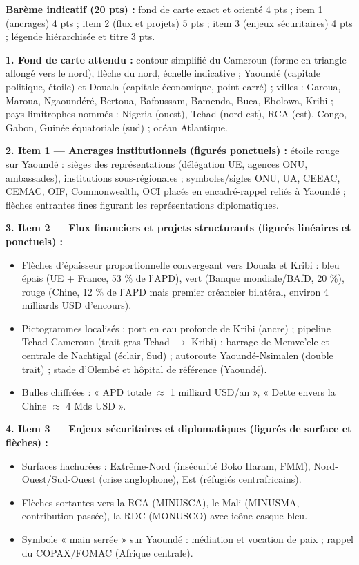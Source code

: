 \documentclass[11pt]{article}
\begin{document}
\begin{corrige}
\textbf{Barème indicatif (20 pts) :} fond de carte exact et orienté 4 pts ; item 1 (ancrages) 4 pts ; item 2 (flux et projets) 5 pts ; item 3 (enjeux sécuritaires) 4 pts ; légende hiérarchisée et titre 3 pts.

\textbf{1. Fond de carte attendu :} contour simplifié du Cameroun (forme en triangle allongé vers le nord), flèche du nord, échelle indicative ; Yaoundé (capitale politique, étoile) et Douala (capitale économique, point carré) ; villes : Garoua, Maroua, Ngaoundéré, Bertoua, Bafoussam, Bamenda, Buea, Ebolowa, Kribi ; pays limitrophes nommés : Nigeria (ouest), Tchad (nord-est), RCA (est), Congo, Gabon, Guinée équatoriale (sud) ; océan Atlantique.

\textbf{2. Item 1 — Ancrages institutionnels (figurés ponctuels) :} étoile rouge sur Yaoundé : sièges des représentations (délégation UE, agences ONU, ambassades), institutions sous-régionales ; symboles/sigles ONU, UA, CEEAC, CEMAC, OIF, Commonwealth, OCI placés en encadré-rappel reliés à Yaoundé ; flèches entrantes fines figurant les représentations diplomatiques.

\textbf{3. Item 2 — Flux financiers et projets structurants (figurés linéaires et ponctuels) :}
\begin{itemize}
    \item Flèches d'épaisseur proportionnelle convergeant vers Douala et Kribi : bleu épais (UE + France, 53 \% de l'APD), vert (Banque mondiale/BAfD, 20 \%), rouge (Chine, 12 \% de l'APD mais premier créancier bilatéral, environ 4 milliards USD d'encours).
    \item Pictogrammes localisés : port en eau profonde de Kribi (ancre) ; pipeline Tchad-Cameroun (trait gras Tchad $\rightarrow$ Kribi) ; barrage de Memve'ele et centrale de Nachtigal (éclair, Sud) ; autoroute Yaoundé-Nsimalen (double trait) ; stade d'Olembé et hôpital de référence (Yaoundé).
    \item Bulles chiffrées : « APD totale $\approx$ 1 milliard USD/an », « Dette envers la Chine $\approx$ 4 Mds USD ».
\end{itemize}

\textbf{4. Item 3 — Enjeux sécuritaires et diplomatiques (figurés de surface et flèches) :}
\begin{itemize}
    \item Surfaces hachurées : Extrême-Nord (insécurité Boko Haram, FMM), Nord-Ouest/Sud-Ouest (crise anglophone), Est (réfugiés centrafricains).
    \item Flèches sortantes vers la RCA (MINUSCA), le Mali (MINUSMA, contribution passée), la RDC (MONUSCO) avec icône casque bleu.
    \item Symbole « main serrée » sur Yaoundé : médiation et vocation de paix ; rappel du COPAX/FOMAC (Afrique centrale).
\end{itemize}


\end{corrige}
\end{document}
